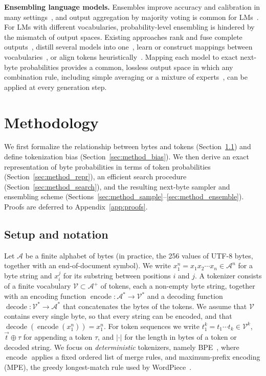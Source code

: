 \documentclass{article} %
\newcommand{\encf}{\operatorname{encode}}
\newcommand{\decf}{\operatorname{decode}}
\newcommand{\Vocab}{\mathcal{V}}
\newcommand{\Abet}{\mathcal{A}}
\newcommand{\cat}{\oplus}
\begin{document}
\textbf{Ensembling language models.}
Ensembles improve accuracy and calibration in many settings~\citep{dietterich2000ensemble,lakshminarayanan2017deepensembles}, and output aggregation by majority voting is common for LMs~\citep{wang2023selfconsistency}. For LMs with different vocabularies, probability-level ensembling is hindered by the mismatch of output spaces. Existing approaches rank and fuse complete outputs~\citep{jiang2023llmblender}, distill several models into one~\citep{wan2024fusellm}, learn or construct mappings between vocabularies~\citep{xu2024eva,huang2024deepen}, or align tokens heuristically~\citep{yu2024gac}. Mapping each model to exact next-byte probabilities provides a common, lossless output space in which any combination rule, including simple averaging or a mixture of experts~\citep{shazeer2017moe}, can be applied at every generation step.

\section{Methodology}
\label{sec:method}
We first formalize the relationship between bytes and tokens (Section~\ref{sec:method_setup}) and define tokenization bias (Section~\ref{sec:method_bias}). We then derive an exact representation of byte probabilities in terms of token probabilities (Section~\ref{sec:method_repr}), an efficient search procedure (Section~\ref{sec:method_search}), and the resulting next-byte sampler and ensembling scheme (Sections~\ref{sec:method_sample}--\ref{sec:method_ensemble}). Proofs are deferred to Appendix~\ref{app:proofs}.

\subsection{Setup and notation}
\label{sec:method_setup}
Let $\Abet$ be a finite alphabet of bytes (in practice, the 256 values of UTF-8 bytes, together with an end-of-document symbol). We write $x_1^n = x_1 x_2 \cdots x_n \in \Abet^n$ for a byte string and $x_i^j$ for its substring between positions $i$ and $j$. A tokenizer consists of a finite vocabulary $\Vocab \subset \Abet^{+}$ of tokens, each a non-empty byte string, together with an encoding function $\encf: \Abet^* \to \Vocab^*$ and a decoding function $\decf: \Vocab^* \to \Abet^*$ that concatenates the bytes of the tokens. We assume that $\Vocab$ contains every single byte, so that every string can be encoded, and that $\decf(\encf(x_1^n)) = x_1^n$. For token sequences we write $t_1^k = t_1 \cdots t_k \in \Vocab^k$, $\vec{t} \cat \tau$ for appending a token $\tau$, and $|\cdot|$ for the length in bytes of a token or decoded string. We focus on \emph{deterministic} tokenizers, namely BPE~\citep{sennrich2016bpe}, where $\encf$ applies a fixed ordered list of merge rules, and maximum-prefix encoding (MPE), the greedy longest-match rule used by WordPiece~\citep{wu2016gnmt}.
\end{document}
